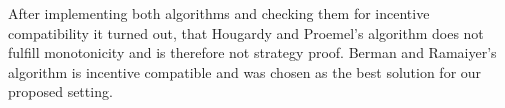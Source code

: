 After implementing both algorithms \cite{githublink} and checking them for incentive compatibility it turned out, that Hougardy and Proemel's algorithm does not fulfill monotonicity and is therefore not strategy proof. Berman and Ramaiyer's algorithm is incentive compatible and was chosen as the best solution for our proposed setting.